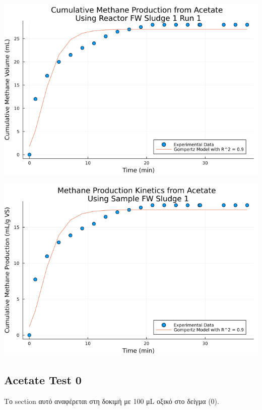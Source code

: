 \documentclass[11pt]{article}
\begin{document}
\begin{center}
\includegraphics[width=.9\linewidth]{../plots/BMPs/Acetate/methane_kinetics_acet_test_fw_s1_min.png}
\end{center}

\begin{center}
\includegraphics[width=.9\linewidth]{../plots/BMPs/Acetate/specific_methane_kinetics_acet_test_fw_s1.png}
\end{center}

\subsection{Acetate Test 0}
\label{sec:orge90d5f6}
Το section αυτό αναφέρεται στη δοκιμή με 100 μL οξικό στο δείγμα (0).
\end{document}
